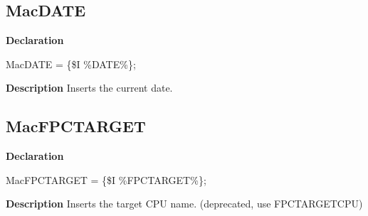 \documentclass{report}
\begin{document}
\subsection*{MacDATE}
\begin{list}{}{
\setlength{\itemindent}{0cm}
\setlength{\listparindent}{0cm}
\setlength{\leftmargin}{\evensidemargin}
\addtolength{\leftmargin}{\tmplength}
\settowidth{\labelsep}{X}
\addtolength{\leftmargin}{\labelsep}
\setlength{\labelwidth}{\tmplength}
}
\begin{flushleft}
\item[\textbf{Declaration}\hfill]
\begin{ttfamily}
MacDATE = {\{}{\$}I {\%}DATE{\%}{\}};\end{ttfamily}


\end{flushleft}
\par
\item[\textbf{Description}]
Inserts the current date.

\end{list}
\subsection*{MacFPCTARGET}
\begin{list}{}{
\setlength{\itemindent}{0cm}
\setlength{\listparindent}{0cm}
\setlength{\leftmargin}{\evensidemargin}
\addtolength{\leftmargin}{\tmplength}
\settowidth{\labelsep}{X}
\addtolength{\leftmargin}{\labelsep}
\setlength{\labelwidth}{\tmplength}
}
\begin{flushleft}
\item[\textbf{Declaration}\hfill]
\begin{ttfamily}
MacFPCTARGET = {\{}{\$}I {\%}FPCTARGET{\%}{\}};\end{ttfamily}


\end{flushleft}
\par
\item[\textbf{Description}]
Inserts the target CPU name. (deprecated, use FPCTARGETCPU)

\end{list}
\end{document}

